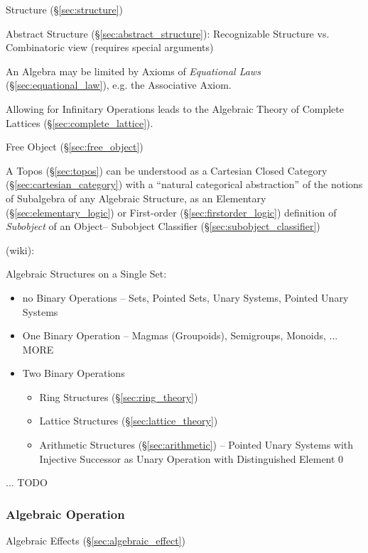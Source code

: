 Structure (\S\ref{sec:structure})

Abstract Structure (\S\ref{sec:abstract_structure}): Recognizable
Structure vs. Combinatoric view (requires special arguments)

An Algebra may be limited by Axioms of \emph{Equational Laws}
(\S\ref{sec:equational_law}), e.g. the Associative Axiom.

Allowing for Infinitary Operations leads to the Algebraic Theory of
Complete Lattices (\S\ref{sec:complete_lattice}).

Free Object (\S\ref{sec:free_object})

\fist A Topos (\S\ref{sec:topos}) can be understood as a Cartesian Closed
Category (\S\ref{sec:cartesian_category}) with a ``natural categorical
abstraction'' of the notions of Subalgebra of any Algebraic Structure, as an
Elementary (\S\ref{sec:elementary_logic}) or First-order
(\S\ref{sec:firstorder_logic}) definition of \emph{Subobject} of an Object--
Subobject Classifier (\S\ref{sec:subobject_classifier})

(wiki):

Algebraic Structures on a Single Set:

\begin{itemize}
  \item no Binary Operations -- Sets, Pointed Sets, Unary Systems, Pointed
    Unary Systems
  \item One Binary Operation -- Magmas (Groupoids), Semigroups, Monoids, ...
    MORE
  \item Two Binary Operations
    \begin{itemize}
      \item Ring Structures (\S\ref{sec:ring_theory})
      \item Lattice Structures (\S\ref{sec:lattice_theory})
      \item Arithmetic Structures (\S\ref{sec:arithmetic}) -- Pointed Unary
        Systems with Injective Successor as Unary Operation with Distinguished
        Element $0$
    \end{itemize}
\end{itemize}

... TODO



\subsubsection{Algebraic Operation}\label{sec:algebraic_operation}

Algebraic Effects (\S\ref{sec:algebraic_effect})



